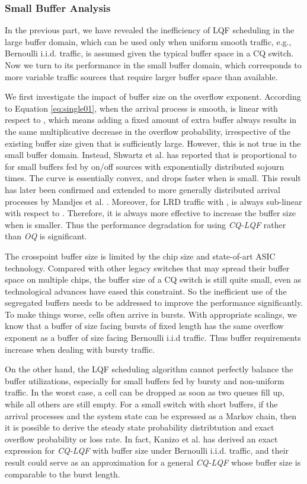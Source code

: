 \documentclass[journal,final,doublecolumn,10pt,twoside]{IEEEtranTCOM} \normalsize
\begin{document}
\subsubsection{Small Buffer Analysis}
In the previous part, we have revealed the inefficiency of LQF scheduling in the large buffer domain, which can be used only when uniform smooth traffic, e.g., Bernoulli i.i.d. traffic, is assumed given the typical buffer space in a CQ switch. Now we turn to its performance in the small buffer domain, which corresponds to more variable traffic sources that require larger buffer space than available.

We first investigate the impact of buffer size on the overflow exponent. According to Equation \ref{eq:single01}, when the arrival process is smooth,  is linear with respect to , which means adding a fixed amount of extra buffer always results in the same multiplicative decrease in the overflow probability, irrespective of the existing buffer size  given that  is sufficiently large. However, this is not true in the small buffer domain. Instead, Shwartz et al. \cite{small01} has reported that  is proportional to  for small buffers fed by on/off sources with exponentially distributed sojourn times. The curve is essentially convex, and drops faster when  is small. This result has later been confirmed and extended to more generally distributed arrival processes by Mandjes et al. \cite{smallbuffergeneral}. Moreover, for LRD traffic with ,  is always sub-linear with respect to . Therefore, it is always more effective to increase the buffer size when  is smaller. Thus the performance degradation for using \emph{CQ-LQF} rather than \emph{OQ} is significant.

The crosspoint buffer size is limited by the chip size and state-of-art ASIC technology. Compared with other legacy switches that may spread their buffer space on multiple chips, the buffer size of a CQ switch is still quite small, even as technological advances have eased this constraint. So the inefficient use of the segregated buffers needs to be addressed to improve the performance significantly. To make things worse, cells often arrive in bursts. With appropriate scalings, we know that a buffer of size  facing bursts of fixed length  has the same overflow exponent as a buffer of size  facing Bernoulli i.i.d traffic. Thus buffer requirements increase when dealing with bursty traffic.

On the other hand, the LQF scheduling algorithm cannot perfectly balance the buffer utilizations, especially for small buffers fed by bursty and non-uniform traffic. In the worst case, a cell can be dropped as soon as two queues fill up, while all others are still empty. For a small switch with short buffers, if the arrival processes and the system state can be expressed as a Markov chain, then it is possible to derive the steady state probability distribtution and exact overflow probability or loss rate. In fact, Kanizo et al. \cite{cqs} has derived an exact expression for \emph{CQ-LQF} with buffer size  under Bernoulli i.i.d. traffic, and their result could serve as an approximation for a general \emph{CQ-LQF} whose buffer size is comparable to the burst length.
\end{document}
